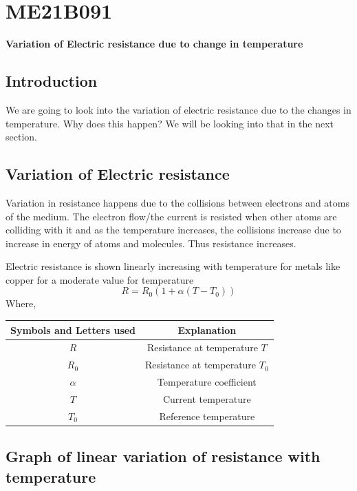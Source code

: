 \section{ME21B091}
\graphicspath{ {./ME21B091/} }
\begin{center}
\textbf{\large Variation of Electric resistance due to change in temperature}
\end{center}

\subsection{Introduction}
We are going to look into the variation of electric resistance due to the changes in temperature. Why does this happen? We will be looking into that in the next section.
\subsection{Variation of Electric resistance}
Variation in resistance happens due to the collisions between electrons and atoms of the medium. The electron flow/the current is resisted when other atoms are colliding with it and as the temperature increases, the collisions increase due to increase in energy of atoms and molecules. Thus resistance increases.

Electric resistance is shown linearly increasing with temperature for metals like copper for a moderate value for temperature
\begin{equation}
 R=R_0 (1+\alpha (T - T_0))
\end{equation}
Where,
\begin{center}
\begin{tabular}{|c|c|}
    \hline
    \textbf{Symbols and Letters used} & \textbf{Explanation} \\
    \hline
    \(R\) & Resistance at temperature \(T\) \\
    \hline
    \(R_0\) & Resistance at temperature \(T_0\) \\
    \hline
    \(\alpha\) & Temperature coefficient \\
    \hline
    \(T\) & Current temperature \\
    \hline
    \(T_0\) & Reference temperature \\
    \hline
     
\end{tabular}
\end{center}

\subsection{Graph of linear variation of resistance with temperature}

